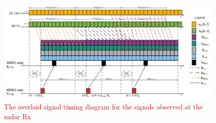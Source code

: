 \documentclass[10pt,journal]{IEEEtran}
\newcommand{\ith}[1]    {{#1}^{\underline{\text{th}}}}
\theoremstyle{definition}
\begin{document}
	\begin{figure}[!t]
		\centering
		\includegraphics[width=1.0\columnwidth]{Timing_diagram_radar.png}
		\caption{\textcolor{red}{The overlaid signal timing diagram for the  signals observed at the radar Rx }
		} 
		\label{fig:systemmodel}
	\end{figure}
	
	
	
	
	
	\color{black}
\end{document}
